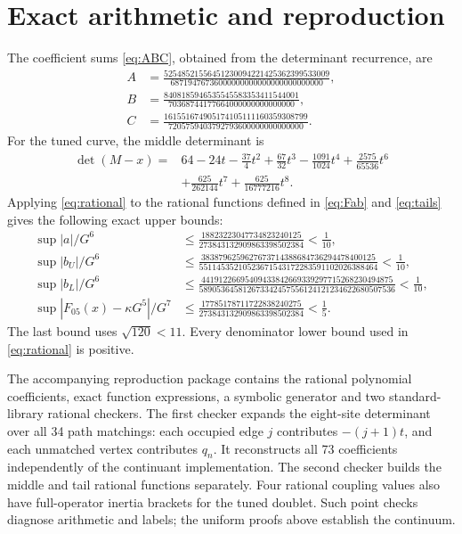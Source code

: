 \documentclass[11pt]{article}
\begin{document}
\section{Exact arithmetic and reproduction}\label{app:arithmetic}
The coefficient sums \eqref{eq:ABC}, obtained from the determinant recurrence, are
\begin{align*}
A&=\frac{52548521556451230094221425362399533009}
{68719476736000000000000000000000000},\\
B&=\frac{8408185946535545583353411544001}
{70368744177664000000000000000},\\
C&=\frac{161551674905174105111160359308799}
{7205759403792793600000000000000}.
\end{align*}
For the tuned curve, the middle determinant is
\begin{align*}
\det(M-x)={}&64-24t-\frac{37}4t^2+\frac{67}{32}t^3
-\frac{1091}{1024}t^4+\frac{2575}{65536}t^6\\
&+\frac{625}{262144}t^7+\frac{625}{16777216}t^8.
\end{align*}
Applying \eqref{eq:rational} to the rational functions defined in
\eqref{eq:Fab} and \eqref{eq:tails} gives the following exact upper bounds:
\begin{align*}
\sup |a|/G^6
&\leq\frac{18823223047734823240125}
{273843132909863398502384}<\frac1{10},\\
\sup |b_U|/G^6
&\leq\frac{3838796259627673714388684736294478400125}
{55114535210523671543172283591102026388464}<\frac1{10},\\
\sup |b_L|/G^6
&\leq\frac{44191226695409433842669339297715268230494875}
{589053645812673342457556124121234622680507536}<\frac1{10},\\
\sup |F_{05}(x)-\kappa G^5|/G^7
&\leq\frac{17785178711722838240275}
{273843132909863398502384}<\frac15 .
\end{align*}
The last bound uses $\sqrt{120}<11$. Every denominator lower bound used in \eqref{eq:rational} is positive.

The accompanying reproduction package contains the rational polynomial coefficients, exact function expressions, a symbolic generator and two standard-library rational checkers. The first checker expands the eight-site determinant over all 34 path matchings: each occupied edge $j$ contributes $-(j+1)t$, and each unmatched vertex contributes $q_n$. It reconstructs all 73 coefficients independently of the continuant implementation. The second checker builds the middle and tail rational functions separately. Four rational coupling values also have full-operator inertia brackets for the tuned doublet. Such point checks diagnose arithmetic and labels; the uniform proofs above establish the continuum.
\end{document}
